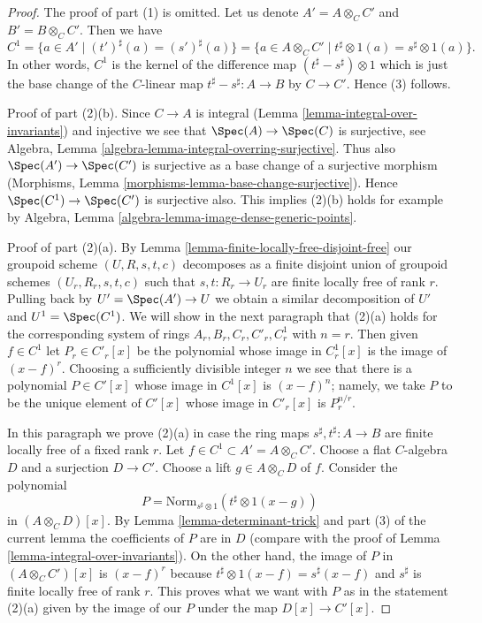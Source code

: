 \begin{proof}
The proof of part (1) is omitted. Let us denote $A' = A \otimes_C C'$ and
$B' = B \otimes_C C'$. Then we have
$$
C^1
= \{a \in A' \mid (t')^\sharp(a) = (s')^\sharp(a) \}
= \{a \in A \otimes_C C' \mid t^\sharp \otimes 1(a) = s^\sharp \otimes 1(a) \}.
$$
In other words, $C^1$ is the kernel of the difference map
$(t^\sharp - s^\sharp) \otimes 1$ which is just the base change
of the $C$-linear map $t^\sharp - s^\sharp : A \to B$ by $C \to C'$.
Hence (3) follows.

\medskip\noindent
Proof of part (2)(b). Since $C \to A$ is integral
(Lemma \ref{lemma-integral-over-invariants}) and injective we see that
$\Spec(A) \to \Spec(C)$ is surjective, see
Algebra, Lemma \ref{algebra-lemma-integral-overring-surjective}.
Thus also $\Spec(A') \to \Spec(C')$ is surjective
as a base change of a surjective morphism
(Morphisms, Lemma \ref{morphisms-lemma-base-change-surjective}).
Hence $\Spec(C^1) \to \Spec(C')$ is surjective also.
This implies (2)(b) holds for example by
Algebra, Lemma \ref{algebra-lemma-image-dense-generic-points}.

\medskip\noindent
Proof of part (2)(a). By Lemma \ref{lemma-finite-locally-free-disjoint-free}
our groupoid scheme $(U, R, s, t, c)$ decomposes as a finite disjoint union
of groupoid schemes $(U_r, R_r, s, t, c)$ such that $s, t : R_r \to U_r$
are finite locally free of rank $r$. Pulling back by $U' = \Spec(A') \to U$
we obtain a similar decomposition of $U'$ and $U^1 = \Spec(C^1)$.
We will show in the next paragraph that (2)(a) holds for the corresponding
system of rings $A_r, B_r, C_r, C'_r, C^1_r$ with $n = r$.
Then given $f \in C^1$ let $P_r \in C'_r[x]$ be the polynomial
whose image in $C^1_r[x]$ is the image of $(x - f)^r$.
Choosing a sufficiently divisible integer $n$ we see that
there is a polynomial $P \in C'[x]$ whose image in $C^1[x]$ is
$(x - f)^n$; namely, we take $P$ to be the unique element of
$C'[x]$ whose image in $C'_r[x]$ is $P_r^{n/r}$.

\medskip\noindent
In this paragraph we prove (2)(a) in case the ring maps
$s^\sharp, t^\sharp : A \to B$ are finite locally free of a fixed rank $r$.
Let $f \in C^1 \subset A' = A \otimes_C C'$. Choose a flat
$C$-algebra $D$ and a surjection $D \to C'$. Choose a lift
$g \in A \otimes_C D$ of $f$.
Consider the polynomial
$$
P = \text{Norm}_{s^\sharp \otimes 1}(t^\sharp \otimes 1(x - g))
$$
in $(A \otimes_C D)[x]$. By Lemma \ref{lemma-determinant-trick}
and part (3) of the current lemma the coefficients of $P$ are in $D$
(compare with the proof of Lemma \ref{lemma-integral-over-invariants}).
On the other hand, the image of $P$ in $(A \otimes_C C')[x]$ is
$(x - f)^r$ because $t^\sharp \otimes 1(x - f) = s^\sharp(x - f)$
and $s^\sharp$ is finite locally free of rank $r$.
This proves what we want with $P$ as in the statement (2)(a)
given by the image of our $P$ under the map $D[x] \to C'[x]$.
\end{proof}

